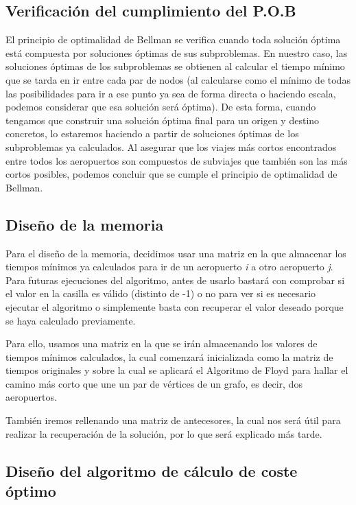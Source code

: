 \subsection{Verificación del cumplimiento del P.O.B}

El principio de optimalidad de Bellman se verifica cuando toda solución óptima está compuesta por soluciones óptimas de sus subproblemas. En nuestro caso, las soluciones óptimas de los subproblemas se obtienen al calcular el tiempo mínimo que se tarda en ir entre cada par de nodos (al calcularse como el mínimo de todas las posibilidades para ir a ese punto ya sea de forma directa o haciendo escala, podemos considerar que esa solución será óptima). De esta forma, cuando tengamos que construir una solución óptima final para un origen y destino concretos, lo estaremos haciendo a partir de soluciones óptimas de los subproblemas ya calculados. Al asegurar que los viajes más cortos encontrados entre todos los aeropuertos son compuestos de subviajes que también son las más cortos posibles, podemos concluir que se cumple el principio de optimalidad de Bellman.

\subsection{Diseño de la memoria}

Para el diseño de la memoria, decidimos usar una matriz en la que almacenar los tiempos mínimos ya calculados para ir de un aeropuerto \textit{i} a otro aeropuerto \textit{j}. Para futuras ejecuciones del algoritmo, antes de usarlo bastará con comprobar si el valor en la casilla es válido (distinto de -1) o no para ver si es necesario ejecutar el algoritmo o simplemente basta con recuperar el valor deseado porque se haya calculado previamente.

Para ello, usamos una matriz en la que se irán almacenando los valores de tiempos mínimos calculados, la cual comenzará inicializada como la matriz de tiempos originales y sobre la cual se aplicará el Algoritmo de Floyd para hallar el camino más corto que une un par de vértices de un grafo, es decir, dos aeropuertos.

También iremos rellenando una matriz de antecesores, la cual nos será útil para realizar la recuperación de la solución, por lo que será explicado más tarde.

\subsection{Diseño del algoritmo de cálculo de coste óptimo}

